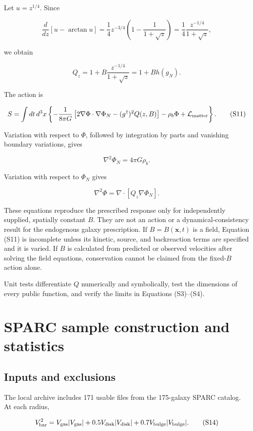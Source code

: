 \documentclass[utf8]{frontiers_suppmat}
\begin{document}
Let \(u=z^{1/4}\). Since

\[
\frac{d}{dz}\left[u-\arctan u\right]
=\frac{1}{4}z^{-3/4}\left(1-\frac{1}{1+\sqrt z}\right)
=\frac{1}{4}\frac{z^{-1/4}}{1+\sqrt z},
\tag{S9}
\]

we obtain

\[
Q_z=1+B\frac{z^{-1/4}}{1+\sqrt z}
=1+B h(g_N).
\tag{S10}
\]

The action is

\[
S=\int dt\,d^3x\left\{
-\frac{1}{8\pi G}
\left[2\nabla\Phi\cdot\nabla\Phi_N-(g^\dagger)^2Q(z,B)\right]
-\rho_b\Phi+\mathcal L_{\rm matter}
\right\}.
\tag{S11}
\]

Variation with respect to \(\Phi\), followed by integration by parts and vanishing boundary variations, gives

\[
\nabla^2\Phi_N=4\pi G\rho_b.
\tag{S12}
\]

Variation with respect to \(\Phi_N\) gives

\[
\nabla^2\Phi=\nabla\cdot\left[Q_z\nabla\Phi_N\right].
\tag{S13}
\]

These equations reproduce the prescribed response only for independently supplied, spatially constant \(B\). They are not an action or a dynamical-consistency result for the endogenous galaxy prescription. If \(B=B(\mathbf x,t)\) is a field, Equation (S11) is incomplete unless its kinetic, source, and backreaction terms are specified and it is varied. If \(B\) is calculated from predicted or observed velocities after solving the field equations, conservation cannot be claimed from the fixed-\(B\) action alone.

Unit tests differentiate \(Q\) numerically and symbolically, test the dimensions of every public function, and verify the limits in Equations (S3)--(S4).

\section{SPARC sample construction and statistics}\label{s4.-sparc-sample-construction-and-statistics}

\subsection{Inputs and exclusions}\label{s4.1-inputs-and-exclusions}

The local archive includes 171 usable files from the 175-galaxy SPARC catalog. At each radius,

\[
V_{\rm bar}^2
=V_{\rm gas}|V_{\rm gas}|
+0.5V_{\rm disk}|V_{\rm disk}|
+0.7V_{\rm bulge}|V_{\rm bulge}|.
\tag{S14}
\]
\end{document}
